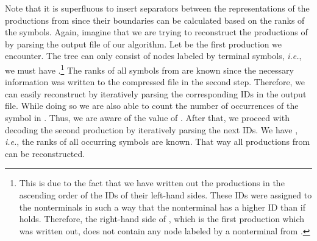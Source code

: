 \documentclass[12pt]{llncs}
\newcommand{\hairsp}{\hspace{1pt}}\newcommand{\TODO}{\textcolor{red}{\bf TODO!}\xspace}
\newcommand{\ie}{\mbox{\textit{i.\hairsp{}e.}}\xspace}
\begin{document}
Note that it is superfluous to insert separators between the representations of the productions from  since their boundaries can be calculated based on the ranks of the symbols. Again, imagine that we are trying to reconstruct the productions of  by parsing the output file of our algorithm. Let  be the first production we encounter. The tree  can only consist of nodes labeled by terminal symbols, \ie, we must have .\footnote{This is due to the fact that we have written out the productions in the ascending order of the IDs of their left-hand sides. These IDs were assigned to the nonterminals in such a way that the nonterminal  has a higher ID than  if  holds. Therefore, the right-hand side of , which is the first production which was written out, does not contain any node labeled by a nonterminal from .} The ranks of all symbols from  are known since the necessary information was written to the compressed file in the second step. Therefore, we can easily reconstruct  by iteratively parsing the corresponding IDs in the output file. While doing so we are also able to count the number of occurrences of the symbol  in . Thus, we are aware of the value of . After that, we proceed with decoding the second production  by iteratively parsing the next IDs. We have , \ie, the ranks of all occurring symbols are known. That way all productions from  can be reconstructed.
\end{document}
